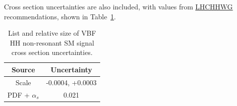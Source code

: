 Cross section uncertainties are also included, with values from \href{https://twiki.cern.ch/twiki/bin/view/LHCPhysics/LHCHWGHH?redirectedfrom=LHCPhysics.LHCHXSWGHH#Latest_recommendations_for_gluon}{\underline{LHCHHWG}} recommendations, shown in Table~\ref{sec:systs:tab:systematics_HHNonResSignalVBF_XSecNumbers}.

\begin{table}
\centering
\small
\begin{tabular}{|c|c|}
\hline
Source & Uncertainty\\
\hline
Scale & -0.0004, +0.0003\\
PDF + $\alpha_s$ & 0.021\\
\hline
\end{tabular}
\caption{List and relative size of VBF HH non-resonant SM signal cross section uncertainties.}
\label{sec:systs:tab:systematics_HHNonResSignalVBF_XSecNumbers}
\end{table}


